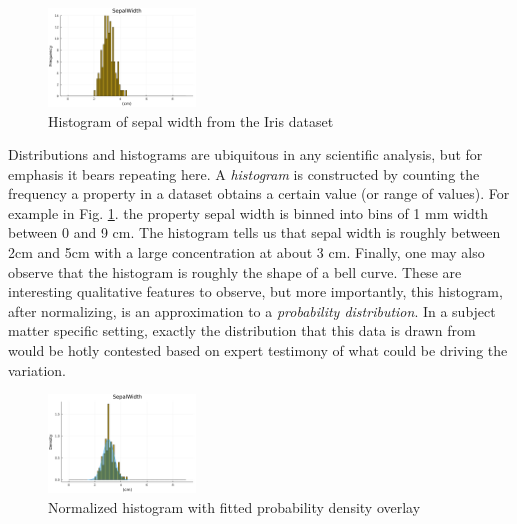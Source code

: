\begin{figure}
\centering
    \includegraphics[width=0.35\textwidth]{Code/SepalWidthTotHist.png}
    \caption{Histogram of sepal width from the Iris dataset}
    \label{fig:SepalWidthTotHist}
\end{figure}
Distributions and histograms are ubiquitous in any scientific analysis, but for emphasis it bears repeating here. A \emph{histogram} is constructed by counting the frequency a property in a dataset obtains a certain value (or range of values). For example in Fig. \ref{fig:SepalWidthTotHist}. the property sepal width is binned into bins of 1 mm width between 0 and 9 cm. The histogram tells us that sepal width is roughly between 2cm and 5cm with a large concentration at about 3 cm. Finally, one may also observe that the histogram is roughly the shape of a bell curve. These are interesting qualitative features to observe, but more importantly, this histogram, after normalizing, is an approximation to a \emph{probability distribution}. In a subject matter specific setting, exactly the distribution that this data is drawn from would be hotly contested based on expert testimony of what could be driving the variation.
\begin{figure}
\centering
    \includegraphics[width=0.35\textwidth]{Code/SepalWidthTotHistFit.png}
    \caption{Normalized histogram with fitted probability density overlay }
    \label{fig:SepalWidthTotHistFit}
\end{figure}

